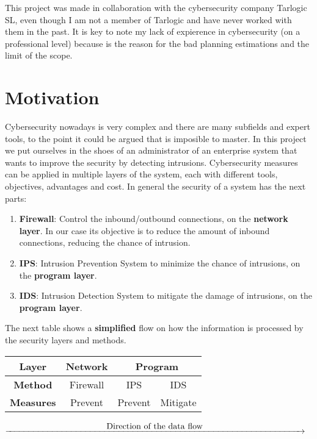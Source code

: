 


This project was made in collaboration with the cybersecurity company Tarlogic SL, even though I am not a member of Tarlogic and have never worked with them in the past. It is key to note my lack of expierence in cybersecurity (on a professional level) because is the reason for the bad planning estimations and the limit of the scope.

\section{Motivation}

Cybersecurity nowadays is very complex and there are many subfields and expert tools, to the point it could be argued that is imposible to master. In this project we put ourselves in the shoes of an administrator of an enterprise system that wants to improve the security by detecting intrusions.
\linej
\linej
Cybersecurity measures can be applied in multiple layers of the system, each with different tools, objectives, advantages and cost. In general the security of a system has the next parts:
\begin{enumerate}
	\item \textbf{Firewall}: Control the inbound/outbound connections, on the \textbf{network layer}. In our case its objective is to reduce the amount of inbound connections, reducing the chance of intrusion.
	\item \textbf{IPS}: Intrusion Prevention System to minimize the chance of intrusions, on the \textbf{program layer}.
	\item \textbf{IDS}: Intrusion Detection System to mitigate the damage of intrusions, on the \textbf{program layer}.
\end{enumerate}

\linej
The next table shows a \textbf{simplified} flow on how the information is processed by the security layers and methods.

\begin{table}[H]
	\centering
	\begin{tabular}{|c|c|c|c|}
	\hline
		\textbf{Layer} & Network & \multicolumn{2}{c|}{Program}\\ \hline
		\textbf{Method} & Firewall & IPS & IDS\\ \hline
		\textbf{Measures} & Prevent & Prevent & Mitigate\\ \hline
	\end{tabular}
\end{table}
$\xrightarrow{\makebox[\textwidth]{Direction of the data flow}}$



